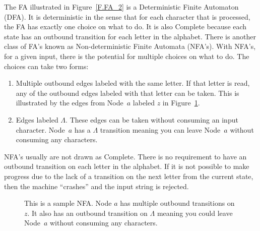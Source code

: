 \documentclass[letterpaper,12pt,openany,reqno]{book}%
\newcommand{\faterminalnode}[3] {\node at (#1) (#2) [circle, draw, double, minimum size=24pt] {#2};}
\newcommand{\fastart}[1] {\coordinate (start) at (#1);}
\newcommand{\fanonterminalnode}[2] {\node at (#1) (#2) [circle, draw, minimum size=24pt] {#2};}
\newcommand{\fatransition}[3] {\draw [->] (#1) -- (#2) node [midway, above] {#3};}
\newcommand{\farighttransition}[3] {\draw [->] (#1) -- (#2) node [midway, right] {#3};}
\begin{document}
The FA illustrated in Figure~\ref{F.FA_2} is a Deterministic Finite Automaton (DFA). It is deterministic in the sense that for each character that is processed, the FA has exactly one choice on what to do. It is also Complete because each state has an outbound transition for each letter in the alphabet. There is another class of FA's known as Non-deterministic Finite Automata (NFA's). With NFA's, for a given input, there is the potential for multiple choices on what to do. The choices can take two forms:
\begin{enumerate}
\item Multiple outbound edges labeled with the same letter. If that letter is read, any of the outbound edges labeled with that letter can be taken. This is illustrated by the edges from Node~$a$ labeled $z$ in Figure~\ref{F.NFA_1}.
\item Edges labeled $\Lambda$. These edges can be taken without consuming an input character. Node~$a$ has a $\Lambda$ transition meaning you can leave Node~$a$ without consuming any characters.
\end{enumerate}
NFA's usually are not drawn as Complete. There is no requirement to have an outbound transition on each letter in the alphabet. If it is not possible to make progress due to the lack of a transition on the next letter from the current state, then the machine ``crashes'' and the input string is rejected.
\begin{figure}[hbt]
\centering
{}
 \caption[Sample Non-deterministic Finite Automaton]{This is a sample NFA. Node $a$ has multiple outbound transitions on $z$. It also has an outbound transition on $\Lambda$ meaning you could leave Node~$a$ without consuming any characters.}
  \label{F.NFA_1}
\end{figure}
\end{document}
